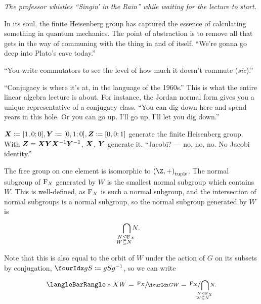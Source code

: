 \documentclass[10pt]{article}
\newenvironment{supplemental}{
\begin{mdframed}%
[hidealllines=true,                 %
  backgroundcolor=red!15!yellow!10  %
]}{\end{mdframed}}
\begin{document}
\emph{The professor whistles ``Singin' in the Rain'' while waiting for the lecture to start.}

In its soul, the finite Heisenberg group has captured the essence of calculating something in quantum mechanics. The point of abstraction is to remove all that gets in the way of communing with the thing in and of itself. 
``We're gonna go deep into Plato's cave today.''

``You write commutators to see the level of how much it doesn't commute (\emph{sic}).''

 ``Conjugacy is where it's at, in the language of the 1960s.'' This is what the entire linear algebra lecture is about. For instance, the Jordan normal form gives you a unique representative of a conjugacy class. ``You can dig down here and spend years in this hole. Or you can go up. I'll go up, I'll let you dig down.''

$\matX\DefineAs\Helt 1 0 0, \matY\DefineAs\Helt 0 1 0, \matZ\DefineAs\Helt 0 0 1$ generate the finite Heisenberg group. With $\matZ=\matX\matY\matX^{-1}\matY^{-1}$, $\matX$, $\matY$ generate it. ``Jacobi? --- no, no, no. No Jacobi identity.'' 

The free group on one element is isomorphic to $\tuple{\Z,+}$. The normal subgroup of $\operatorname{F}_{X}$ generated by $W$ is the smallest normal subgroup which contains $W$. This is well-defined, as $\operatorname{F}_{X}$ is such a normal subgroup, and the intersection of normal subgroups is a normal subgroup, so the normal subgroup generated by $W$ is
\begin{equation*}
  \IntersectionOver {
    \LongDomainSpec{
      \mathllap{N\NormalSubgroup} \mathrlap{\FreeGroup X}\\
      \mathllap{W\Subset} \mathrlap{N}
    }
  } N.
\end{equation*}
\begin{supplemental}
Note that this is also equal to the orbit of $W$ under the action of $G$ on its subsets by conjugation, $\LeftConjugationAction g S \DefineAs g S g^{-1}$, so we can write
\begin{equation*}
\GroupPresentation{X}{W} = \QuotientGroup{\FreeGroup X}{\LeftConjugationAction G W} = \QuotientGroup{\FreeGroup X}{
  \IntersectionOver {
    \LongDomainSpec{
      \mathllap{N\NormalSubgroup} \mathrlap{\FreeGroup X}\\
      \mathllap{W\Subset} \mathrlap{N}
    }
  } N.
}
\end{equation*}
\end{supplemental}
\end{document}
